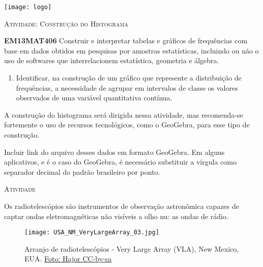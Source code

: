 \documentclass[10 pt,usenames,dvipsnames, oneside]{article}
\begin{document}
\begin{center}
  \begin{minipage}[l]{3cm}
\texttt{[image: logo]}    
\end{minipage}\hfill
\begin{minipage}[r]{.8\textwidth}
 {\Large \scshape Atividade: Construção do Histograma}  
\end{minipage}
\end{center}
\vspace{.2cm}

\ifdefined\prof
\begin{objetivos}
\item \textbf{EM13MAT406} Construir e interpretar tabelas e gráficos de frequências com base em dados obtidos em pesquisas por amostras estatísticas, incluindo ou não o uso de softwares que interrelacionem estatística, geometria e álgebra.
\end{objetivos}

\begin{goals}
\begin{enumerate}
\item Identificar, na construção de um gráfico que represente a distribuição de frequências, a necessidade de agrupar em intervalos de classe os valores observados de uma variável quantitativa contínua.
\end{enumerate}

\tcblower

A construção do histograma será dirigida nessa atividade, mas recomenda-se fortemente o uso de recursos tecnológicos, como o GeoGebra, para esse tipo de construção.

Incluir link do arquivo desses dados em formato GeoGebra. Em alguns aplicativos, e é o caso do GeoGebra, é necessário substituir a vírgula como separador decimal do padrão brasileiro por ponto.

\end{goals}

\bigskip
\begin{center}
{\large \scshape Atividade}
\end{center}
\fi

Os radiotelescópios são instrumentos de observação astronômica capazes de captar ondas eletromagnéticas não visíveis a olho nu: as ondas de rádio.

\begin{figure}[H]
\centering

\noindent
\texttt{[image: USA\_NM\_VeryLargeArray\_03.jpg]}

\caption{Arranjo de radiotelescópios - Very Large Array (VLA), New Mexico, EUA. \href{https://commons.wikimedia.org/wiki/File:USA.NM.VeryLargeArray.03.jpg}{Foto: Hajor CC-by-sa}}

\label{est1-fig-9}
\end{figure}
\end{document}
